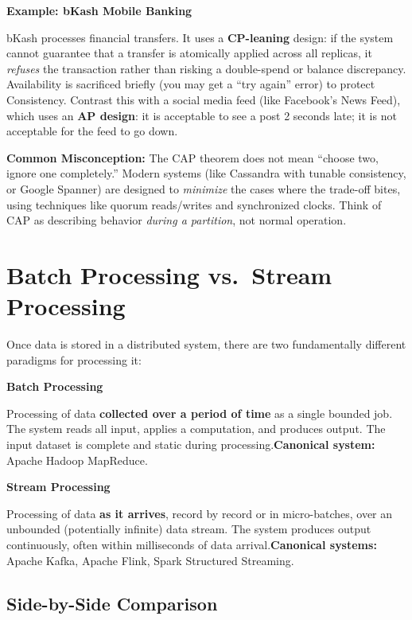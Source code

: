 \documentclass[12pt,a4paper]{article}
\newcommand{\defbox}[2]{%
  \noindent
  \colorbox{PUNavy!12}{%
    \begin{minipage}{\dimexpr\linewidth-2\fboxsep}
      \vspace{4pt}
      \textbf{\textcolor{PUNavy}{#1}}\par\vspace{2pt}
      #2
      \vspace{4pt}
    \end{minipage}%
  }\par\vspace{6pt}%
}
\newcommand{\examplebox}[2]{%
  \noindent
  \colorbox{PUTeal!10}{%
    \begin{minipage}{\dimexpr\linewidth-2\fboxsep}
      \vspace{4pt}
      \textbf{\textcolor{PUTeal}{Example: #1}}\par\vspace{2pt}
      #2
      \vspace{4pt}
    \end{minipage}%
  }\par\vspace{6pt}%
}
\newcommand{\cautionbox}[1]{%
  \noindent
  \colorbox{PURed!10}{%
    \begin{minipage}{\dimexpr\linewidth-2\fboxsep}
      \vspace{4pt}
      \textcolor{PURed}{\textbf{Common Misconception:}} \; #1
      \vspace{4pt}
    \end{minipage}%
  }\par\vspace{6pt}%
}
\begin{document}
\examplebox{bKash Mobile Banking}{bKash processes financial transfers. It uses a \textbf{CP-leaning} design: if the system cannot guarantee that a transfer is atomically applied across all replicas, it \textit{refuses} the transaction rather than risking a double-spend or balance discrepancy. Availability is sacrificed briefly (you may get a ``try again'' error) to protect Consistency. Contrast this with a social media feed (like Facebook's News Feed), which uses an \textbf{AP design}: it is acceptable to see a post 2 seconds late; it is not acceptable for the feed to go down.}

\cautionbox{The CAP theorem does not mean ``choose two, ignore one completely.'' Modern systems (like Cassandra with tunable consistency, or Google Spanner) are designed to \textit{minimize} the cases where the trade-off bites, using techniques like quorum reads/writes and synchronized clocks. Think of CAP as describing behavior \textit{during a partition}, not normal operation.}

\section{Batch Processing vs.\ Stream Processing}

Once data is stored in a distributed system, there are two fundamentally different paradigms for processing it:

\defbox{Batch Processing}{Processing of data \textbf{collected over a period of time} as a single bounded job. The system reads all input, applies a computation, and produces output. The input dataset is complete and static during processing.\newline\textbf{Canonical system:} Apache Hadoop MapReduce.}

\defbox{Stream Processing}{Processing of data \textbf{as it arrives}, record by record or in micro-batches, over an unbounded (potentially infinite) data stream. The system produces output continuously, often within milliseconds of data arrival.\newline\textbf{Canonical systems:} Apache Kafka, Apache Flink, Spark Structured Streaming.}

\subsection{Side-by-Side Comparison}
\end{document}
